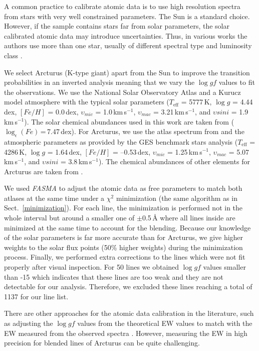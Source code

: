 \documentclass[fleqn,usenatbib]{mnras}
\begin{document}
A common practice to calibrate atomic data is to use high resolution spectra from stars with very well constrained parameters. The Sun is a standard choice. However, if the sample 
contains stars far from solar parameters, the solar calibrated atomic data may introduce uncertainties. Thus, in various works the authors use more than one star, usually of different 
spectral type and luminosity class \citep{Shetrone2015, boeche2016}. 

We select Arcturus (K-type giant) apart from the Sun to improve the transition probabilities in an inverted analysis meaning that we vary the $\log gf$ values to fit the observations. 
We use the National Solar Observatory Atlas \citep{wallace2011} and a Kurucz model atmosphere with the typical solar parameters ($T_{\mathrm{eff}}$ = 5777\,K, 
$\log g$ = 4.44\,dex, $[Fe/H]$ = 0.0\,dex, $\upsilon_{mic}$ = 1.0\,km\,s$^{-1}$, $\upsilon_{mac}$ = 3.21\,km\,s$^{-1}$, and $\upsilon sini$ = 1.9\,km\,s$^{-1}$). 
The solar chemical abundances used in this work are taken from \cite{Anders1989} ($\log_{\epsilon}(Fe)$\,=\,7.47\,dex). For Arcturus, we use the atlas spectrum from \cite{Hinkel2000} 
and the atmospheric parameters as provided by the GES benchmark stars analysis ($T_{\mathrm{eff}}$ = 4286\,K, $\log g$ = 1.64\,dex, $[Fe/H]$ = --0.53\,dex, 
$\upsilon_{mic}$ = 1.25\,km\,s$^{-1}$, $\upsilon_{mac}$ = 5.07\,km\,s$^{-1}$, and $\upsilon sini$ = 3.8\,km\,s$^{-1}$). The chemical abundances of other elements for Arcturus are 
taken from \cite{jofre2015}. 

We used \textit{FASMA} to adjust the atomic data as free parameters to match both atlases at the same time under a $\chi^{2}$ minimization (the same algorithm 
as in Sect.~\ref{minimization}). For each line, the minimization is performed not in the whole interval but around a smaller one of $\pm$0.5\,\AA{} where all lines inside are minimized 
at the same time to account for the blending. Because our knowledge of the solar parameters is far more accurate than for Arcturus, we give higher weights to the solar 
flux points (50\% higher weights) during the minimization process. Finally, we performed extra corrections to the lines which were not fit properly after visual inspection. 
For 50 lines we obtained $\log gf$ values smaller than -15 which indicates that these lines are too weak and they are not detectable for our analysis. Therefore, we excluded these lines reaching a 
total of 1137 for our line list. 

There are other approaches for the atomic data calibration in the literature, such as adjusting the $\log gf$ values from the theoretical EW values to match with the EW measured from the observed 
spectra \citep[e.g.][]{sousa2008, boeche2016, Andreasen2016}. However, measuring the EW in high precision for blended lines of Arcturus can be quite challenging. 
\end{document}
